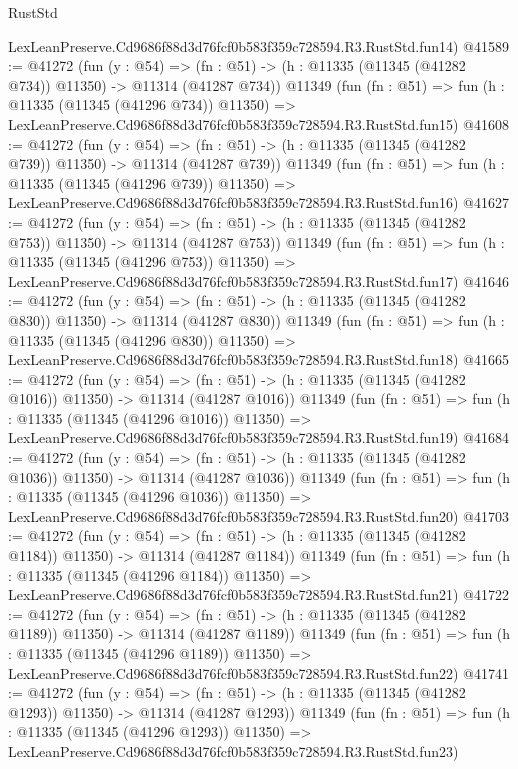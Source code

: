 \begin{lexlean}{RustStd}
\begin{coremodule}
    LexLeanPreserve.Cd9686f88d3d76fcf0b583f359c728594.R3.RustStd.fun14)
@41589 := @41272
    (fun (y : @54) =>
    (fn : @51) -> (h : @11335 (@11345 (@41282 @734)) @11350) -> @11314 (@41287 @734))
    @11349
    (fun (fn : @51) =>
    fun (h : @11335 (@11345 (@41296 @734)) @11350) =>
    LexLeanPreserve.Cd9686f88d3d76fcf0b583f359c728594.R3.RustStd.fun15)
@41608 := @41272
    (fun (y : @54) =>
    (fn : @51) -> (h : @11335 (@11345 (@41282 @739)) @11350) -> @11314 (@41287 @739))
    @11349
    (fun (fn : @51) =>
    fun (h : @11335 (@11345 (@41296 @739)) @11350) =>
    LexLeanPreserve.Cd9686f88d3d76fcf0b583f359c728594.R3.RustStd.fun16)
@41627 := @41272
    (fun (y : @54) =>
    (fn : @51) -> (h : @11335 (@11345 (@41282 @753)) @11350) -> @11314 (@41287 @753))
    @11349
    (fun (fn : @51) =>
    fun (h : @11335 (@11345 (@41296 @753)) @11350) =>
    LexLeanPreserve.Cd9686f88d3d76fcf0b583f359c728594.R3.RustStd.fun17)
@41646 := @41272
    (fun (y : @54) =>
    (fn : @51) -> (h : @11335 (@11345 (@41282 @830)) @11350) -> @11314 (@41287 @830))
    @11349
    (fun (fn : @51) =>
    fun (h : @11335 (@11345 (@41296 @830)) @11350) =>
    LexLeanPreserve.Cd9686f88d3d76fcf0b583f359c728594.R3.RustStd.fun18)
@41665 := @41272
    (fun (y : @54) =>
    (fn : @51) -> (h : @11335 (@11345 (@41282 @1016)) @11350) -> @11314 (@41287 @1016))
    @11349
    (fun (fn : @51) =>
    fun (h : @11335 (@11345 (@41296 @1016)) @11350) =>
    LexLeanPreserve.Cd9686f88d3d76fcf0b583f359c728594.R3.RustStd.fun19)
@41684 := @41272
    (fun (y : @54) =>
    (fn : @51) -> (h : @11335 (@11345 (@41282 @1036)) @11350) -> @11314 (@41287 @1036))
    @11349
    (fun (fn : @51) =>
    fun (h : @11335 (@11345 (@41296 @1036)) @11350) =>
    LexLeanPreserve.Cd9686f88d3d76fcf0b583f359c728594.R3.RustStd.fun20)
@41703 := @41272
    (fun (y : @54) =>
    (fn : @51) -> (h : @11335 (@11345 (@41282 @1184)) @11350) -> @11314 (@41287 @1184))
    @11349
    (fun (fn : @51) =>
    fun (h : @11335 (@11345 (@41296 @1184)) @11350) =>
    LexLeanPreserve.Cd9686f88d3d76fcf0b583f359c728594.R3.RustStd.fun21)
@41722 := @41272
    (fun (y : @54) =>
    (fn : @51) -> (h : @11335 (@11345 (@41282 @1189)) @11350) -> @11314 (@41287 @1189))
    @11349
    (fun (fn : @51) =>
    fun (h : @11335 (@11345 (@41296 @1189)) @11350) =>
    LexLeanPreserve.Cd9686f88d3d76fcf0b583f359c728594.R3.RustStd.fun22)
@41741 := @41272
    (fun (y : @54) =>
    (fn : @51) -> (h : @11335 (@11345 (@41282 @1293)) @11350) -> @11314 (@41287 @1293))
    @11349
    (fun (fn : @51) =>
    fun (h : @11335 (@11345 (@41296 @1293)) @11350) =>
    LexLeanPreserve.Cd9686f88d3d76fcf0b583f359c728594.R3.RustStd.fun23)

\end{coremodule}
\end{lexlean}
